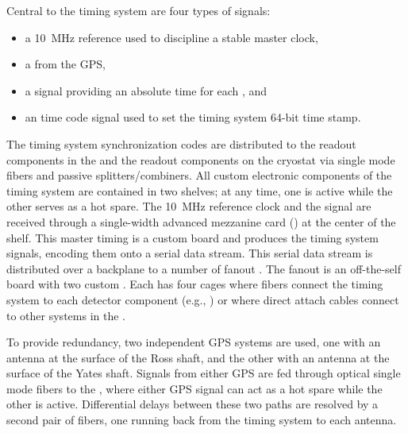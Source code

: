 Central to the timing system are four types of signals:
\begin{itemize}
\item a \SI{10}{\mega\hertz} reference used to discipline a stable master clock,
\item a  from the GPS,
\item a  signal providing an absolute time for each , and
\item an  time code signal
  used to set the timing system 64-bit time stamp.
\end{itemize}

The timing system synchronization codes are distributed to the  readout components in the  and the readout components on the cryostat via single mode fibers and passive splitters/combiners.
All custom electronic components of the timing system are contained in two  shelves; at any time, one is active while the other serves as a hot spare.
The \SI{10}{MHz} reference clock and the  signal are received through a single-width advanced mezzanine card () at the center of the  shelf.
This master timing  is a custom board and produces the timing system signals, encoding them onto a serial data stream.
This serial data stream is distributed over a backplane to a number of fanout .
The fanout  is an off-the-self board with two custom .
Each  has four  cages where fibers connect the timing system to each detector component (e.g., ) or where direct attach cables connect to other systems in the .

To provide redundancy, two independent GPS systems are used,
one with an antenna at the surface of the Ross shaft, and the other
with an antenna at the surface of the Yates shaft. Signals from either
GPS are fed through optical single mode fibers to the , where
either GPS signal can act as a hot spare while the other is active. 
Differential delays between these two paths are resolved by a second pair of fibers, one running back from the timing system to each antenna.


